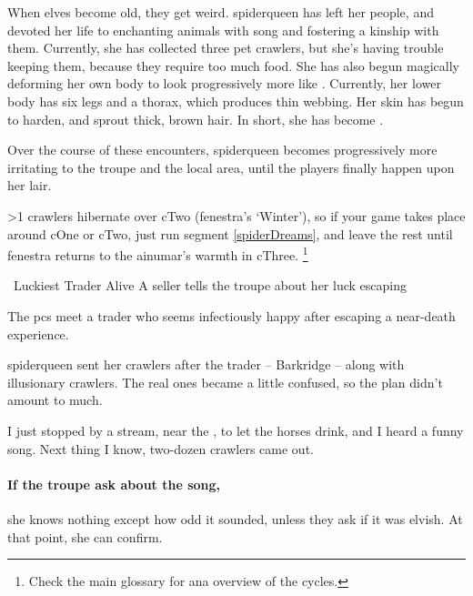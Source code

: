 \label{spiderSong}

\noindent
When elves become old, they get weird.
\Gls{spiderqueen} has left her people, and devoted her life to enchanting animals with song and fostering a kinship with them.
Currently, she has collected three pet \glspl{crawler}, but she's having trouble keeping them, because they require too much food.
She has also begun magically deforming her own body to look progressively more like .
Currently, her lower body has six legs and a thorax, which produces thin webbing.
Her skin has begun to harden, and sprout thick, brown hair.
In short, she has become .

Over the course of these encounters, \gls{spiderqueen} becomes progressively more irritating to the troupe and the local area, until the players finally happen upon her lair.

\ifnum\value{cycle}>1
  \Glspl{crawler} hibernate over \gls{cTwo} (\gls{fenestra}'s `Winter'), so if your game takes place around \gls{cOne} or \gls{cTwo}, just run \gls{segment} \ref{spiderDreams}, and leave the rest until \gls{fenestra} returns to the \gls{ainumar}'s warmth in \gls{cThree}.%
  \footnote{Check the main glossary  for ana overview of the \glspl{cycle}.}
\else
  
\fi

{\squash~Luckiest Trader Alive}%
{A seller tells the troupe about her luck escaping }%
\label{spiderPt2}

The \glspl{pc} meet a trader who seems infectiously happy after escaping a near-death experience.

\begin{exampletext}
  \Gls{spiderqueen} sent her \glspl{crawler} after the trader -- Barkridge -- along with illusionary crawlers.
  The real ones became a little confused, so the plan didn't amount to much.
\end{exampletext}

\begin{boxtext}
  \begin{speechtext}
  I just stopped by a stream, near the , to let the horses drink, and I heard a funny song.
  Next thing I know, two-dozen crawlers came out.
  \end{speechtext}
\end{boxtext}

\paragraph{If the troupe ask about the song,}
she knows nothing except how odd it sounded, unless they ask if it was elvish.
At that point, she can confirm.

